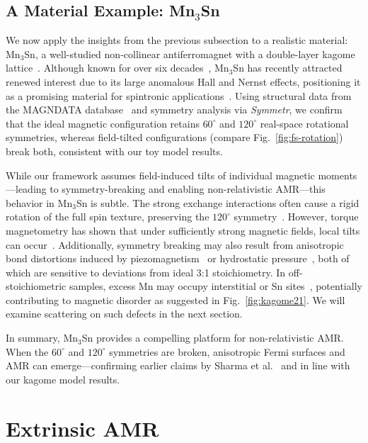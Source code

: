 \documentclass[prb,showpacs,amsmath,amssymb,superscriptaddress,twocolumn,floatfix]{revtex4-1}
\begin{document}
\subsection{A Material Example: Mn$_3$Sn}
\label{sec_I_mat}

{\color{blue} We now apply the insights from the previous subsection to a realistic material: Mn$_3$Sn, a well-studied non-collinear antiferromagnet with a double-layer kagome lattice~\cite{Tomiyashi:1982}. Although known for over six decades~\cite{Cable:1993_a}, Mn$_3$Sn has recently attracted renewed interest due to its large anomalous Hall and Nernst effects, positioning it as a promising material for spintronic applications~\cite{Manna:2018, Chen:2021, Nakatsuji:2015}.
Using structural data from the MAGNDATA database~\cite{Magndata:Mn3Sn} and symmetry analysis via \textit{Symmetr}\cite{Symmetr}, we confirm that the ideal magnetic configuration retains $60^\circ$ and $120^\circ$ real-space rotational symmetries, whereas field-tilted configurations (compare Fig.~\ref{fig:fs-rotation}) break both, consistent with our toy model results.

While our framework assumes field-induced tilts of individual magnetic moments—leading to symmetry-breaking and enabling non-relativistic AMR—this behavior in Mn$_3$Sn is subtle. The strong exchange interactions often cause a rigid rotation of the full spin texture, preserving the $120^\circ$ symmetry~\cite{Tomiyashi:1982, Wu:2023}. However, torque magnetometry has shown that under sufficiently strong magnetic fields, local tilts can occur~\cite{Li:2021}. Additionally, symmetry breaking may also result from anisotropic bond distortions induced by piezomagnetism~\cite{Meng:2024} or hydrostatic pressure~\cite{Singh:2020}, both of which are sensitive to deviations from ideal 3:1 stoichiometry. In off-stoichiometric samples, excess Mn may occupy interstitial or Sn sites~\cite{Gas:2025_a}, potentially contributing to magnetic disorder as suggested in Fig.~\ref{fig:kagome21}. We will examine scattering on such defects in the next section.

In summary, Mn$_3$Sn provides a compelling platform for non-relativistic AMR. When the $60^\circ$ and $120^\circ$ symmetries are broken, anisotropic Fermi surfaces and AMR can emerge—confirming earlier claims by Sharma et al.~\cite{Sharma:2023_a} and in line with our kagome model results.}


\section{Extrinsic AMR}
\label{sec_extrinsic}
\end{document}
